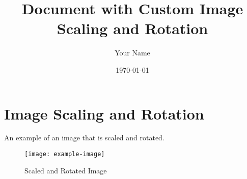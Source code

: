 \documentclass[11pt,a4paper]{article}
\title{Document with Custom Image Scaling and Rotation}
\author{Your Name}
\date{\today}
\begin{document}
\maketitle

\section{Image Scaling and Rotation}
An example of an image that is scaled and rotated.

\begin{figure}[H]
  \centering
  \texttt{[image: example-image]}
  \caption{Scaled and Rotated Image}
  \label{fig:rotatedimage}
\end{figure}
\end{document}
